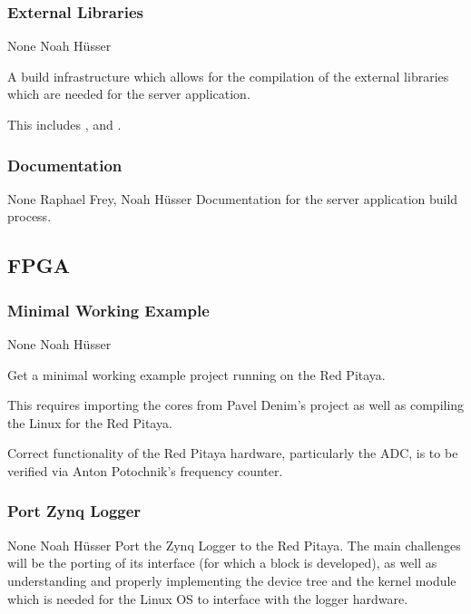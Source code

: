 \documentclass[a4paper,oneside]{alpenspecs/alpenspecs}
\begin{document}
\subsubsection{External Libraries}
\label{subsubsec:fw:server:libs}
\wpac
     {}
     {}
     {}
     {None}
     {}
     {Noah H\"usser}
     {%
         A build infrastructure which allows for the compilation of the
         external libraries which are needed for the server application.

         This includes ,  and .
     }

\subsubsection{Documentation}
\label{subsubsec:fw:server:docs}
\wpac
     {}
     {}
     {}
     {None}
     {}
     {Raphael Frey, Noah H\"usser}
     {%
         Documentation for the server application build process.
     }

\subsection{FPGA}
\label{subsec:fw:fpga}

\subsubsection{Minimal Working Example}
\label{subsubsec:fw:fpga:mwe}
\wpac
     {}
     {}
     {}
     {None}
     {}
     {Noah H\"usser}
     {%
         Get a minimal working example project running on the Red Pitaya.

         This requires importing the cores from Pavel Denim's project as
         well as compiling the Linux for the Red Pitaya.

         Correct functionality of the Red Pitaya hardware, particularly the
         ADC, is to be verified via Anton Potochnik's frequency counter.
     }

\subsubsection{Port Zynq Logger}
\label{subsubsec:fw:fpga:logger}
\wpac
     {}
     {}
     {}
     {None}
     {}
     {Noah H\"usser}
     {%
         Port the Zynq Logger to the Red Pitaya. The main challenges will be
         the porting of its interface (for which a block 
         is developed), as well as understanding and properly implementing the
         device tree and the kernel module which is needed for the Linux OS
         to interface with the logger hardware.
     }
\end{document}
